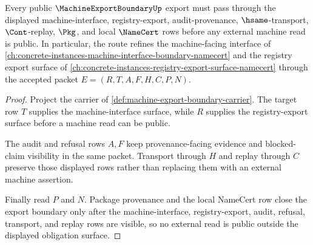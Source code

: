 \begin{theorem}
\label{thm:machine-export-boundary-obligation-surface}
Every public $\MachineExportBoundaryUp$ export must pass through the displayed machine-interface, registry-export, audit-provenance, $\hsame$-transport, $\Cont$-replay, $\Pkg$, and local $\NameCert$ rows before any external machine read is public. In particular, the route refines the machine-facing interface of \autoref{ch:concrete-instances-machine-interface-boundary-namecert} and the registry export surface of \autoref{ch:concrete-instances-registry-export-surface-namecert} through the accepted packet $E=(R,T,A,F,H,C,P,N)$.
\end{theorem}
\begin{proof}
Project the carrier of \autoref{def:machine-export-boundary-carrier}. The target row $T$ supplies the machine-interface surface, while $R$ supplies the registry-export surface before a machine read can be public.

The audit and refusal rows $A,F$ keep provenance-facing evidence and blocked-claim visibility in the same packet. Transport through $H$ and replay through $C$ preserve those displayed rows rather than replacing them with an external machine assertion.

Finally read $P$ and $N$. Package provenance and the local NameCert row close the export boundary only after the machine-interface, registry-export, audit, refusal, transport, and replay rows are visible, so no external read is public outside the displayed obligation surface.
\end{proof}

